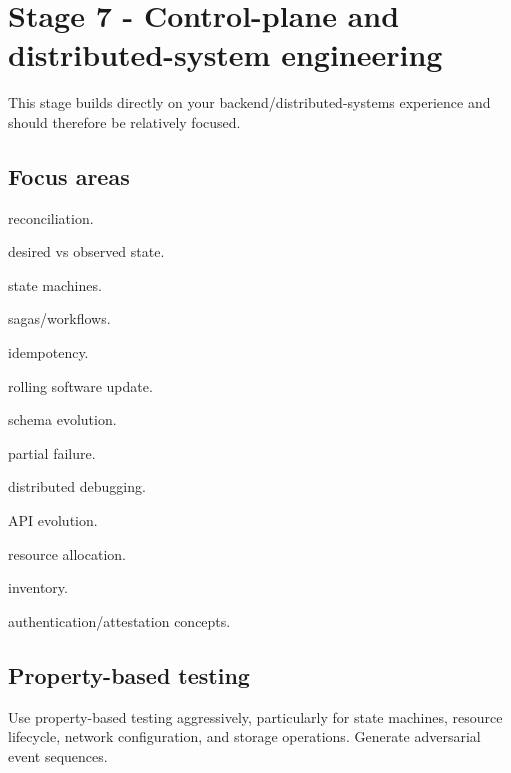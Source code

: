 \documentclass[11pt,letterpaper]{article}
\begin{document}
\section{Stage 7 - Control-plane and distributed-system engineering}\label{sec:11}

\label{stage:7}

This stage builds directly on your backend/distributed-systems experience and should therefore be relatively focused.

\subsection*{Focus areas}

\begin{topics}

\item reconciliation.

\item desired vs observed state.

\item state machines.

\item sagas/workflows.

\item idempotency.

\item rolling software update.

\item schema evolution.

\item partial failure.

\item distributed debugging.

\item API evolution.

\item resource allocation.

\item inventory.

\item authentication/attestation concepts.

\end{topics}

\subsection*{Property-based testing}

Use property-based testing aggressively, particularly for state machines, resource lifecycle, network configuration, and storage operations. Generate adversarial event sequences.
\end{document}
